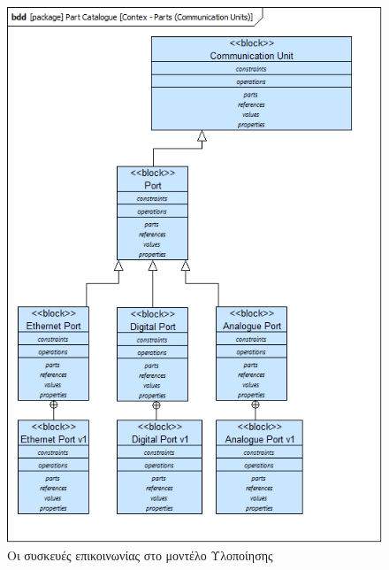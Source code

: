 \documentclass[a4paper,12pt,twoside]{report}
\begin{document}
\begin{appendices}
				\clearpage
				\begin{figure}[hp]
					\centering
					\includegraphics[scale=0.50]{DesignModel_Contex-Parts(CommunicationUnits).png}
					\caption{Οι συσκευές επικοινωνίας στο μοντέλο Υλοποίησης}
					\label{φωτ:Οι συσκευές επικοινωνίας στο μοντέλο Υλοποίησης}
				\end{figure}


\end{appendices}
\end{document}
